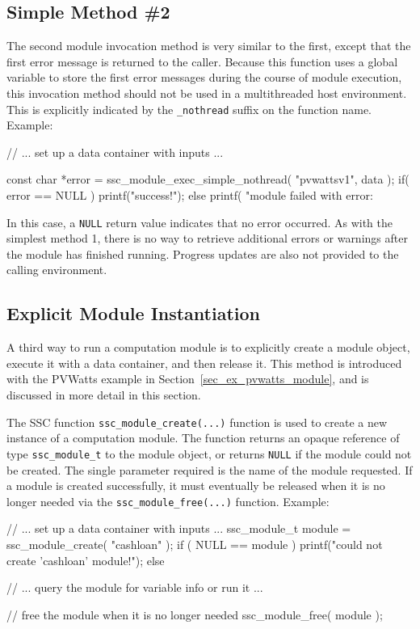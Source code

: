 \documentclass{article}
\begin{document}
\subsection{Simple Method \#2}
The second module invocation method is very similar to the first, except that the first error message is returned to the caller.  Because this function uses a global variable to store the first error messages during the course of module execution, this invocation method should not be used in a multithreaded host environment.  This is explicitly indicated by the \texttt{\_nothread} suffix on the function name.  Example:

\begin{verbatimtab}[4]
// ... set up a data container with inputs ...

const char *error = ssc_module_exec_simple_nothread( "pvwattsv1", data );
if( error == NULL )
	printf("success!\n");
else
	printf( "module failed with error: %
\end{verbatimtab}

In this case, a \texttt{NULL} return value indicates that no error occurred.  As with the simplest method 1, there is no way to retrieve additional errors or warnings after the module has finished running.  Progress updates are also not provided to the calling environment.

\subsection{Explicit Module Instantiation}
\label{sec_explicit_modules}

A third way to run a computation module is to explicitly create a module object, execute it with a data container, and then release it.  This method is introduced with the PVWatts example in Section~\ref{sec_ex_pvwatts_module}, and is discussed in more detail in this section.

The SSC function \texttt{ssc\_module\_create(...)} function is used to create a new instance of a computation module.  The function returns an opaque reference of type \texttt{ssc\_module\_t} to the module object, or returns \texttt{NULL} if the module could not be created.  The single parameter required is the name of the module requested.  If a module is created successfully, it must eventually be released when it is no longer needed via the \texttt{ssc\_module\_free(...)} function.  Example:

\begin{verbatimtab}[4]
// ... set up a data container with inputs ...
ssc_module_t module = ssc_module_create( "cashloan" );
if ( NULL == module )
	printf("could not create 'cashloan' module!\n");
else
{
	// ... query the module for variable info or run it ...

	// free the module when it is no longer needed
	ssc_module_free( module );
}
\end{verbatimtab}
\end{document}
